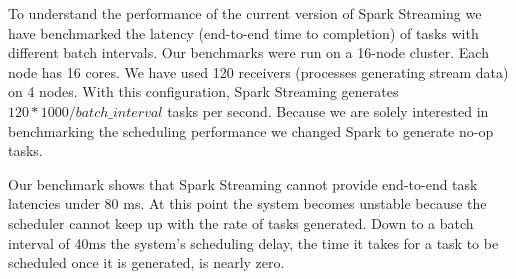 To understand the performance of the current version of Spark Streaming we have benchmarked the latency (end-to-end time to completion) of tasks with different batch intervals. 
Our benchmarks were run on a 16-node cluster. Each node has 16 cores. We have used 120 receivers (processes generating stream data) on 4 nodes. 
With this configuration, Spark Streaming generates $120*1000/batch\_interval$ tasks per second.
Because we are solely interested in benchmarking the scheduling performance we changed Spark to generate no-op tasks.

Our benchmark shows that Spark Streaming cannot provide end-to-end task latencies under 80 ms. At this point the system becomes unstable because the scheduler cannot keep up with the rate of tasks generated. Down to a batch interval of 40ms the system's scheduling delay, the time it takes for a task to be scheduled once it is generated, is nearly zero.

